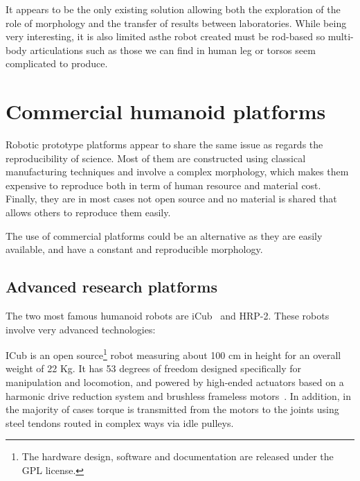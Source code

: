\begin{figure}[tb]
\centering
    \hfil
    \caption{}
    \label{fig:locokit}
\end{figure}

It appears to be the only existing solution allowing both the exploration of the role of morphology and the transfer of results between laboratories. While being very interesting, it is also limited asthe robot created must be rod-based so multi-body articulations such as those we can find in human leg or torsos seem complicated to produce.


\section{Commercial humanoid platforms} %

Robotic prototype platforms appear to share the same issue as regards the reproducibility of science. Most of them are constructed using classical manufacturing techniques and involve a complex morphology, which makes them expensive to reproduce both in term of human resource and material cost. Finally, they are in most cases not open source and no material is shared that allows others to reproduce them easily.

The use of commercial platforms could be an alternative as they are easily available, and have a constant and reproducible morphology.

\subsection{Advanced research platforms} %

The two most famous humanoid robots are iCub~\parencite{metta2008icub} and HRP-2. These robots involve very advanced technologies:

ICub is an open source\footnote{The hardware design, software and documentation are released under the GPL license.} robot measuring about 100 cm in height for an overall weight of 22 Kg. It has 53 degrees of freedom designed specifically for manipulation and locomotion, and powered by high-ended actuators based on a harmonic drive reduction system and brushless frameless motors~\parencite{natale2013icub}. In addition, in the majority of cases torque is transmitted from the motors to the joints using steel tendons routed in complex ways via idle pulleys.

